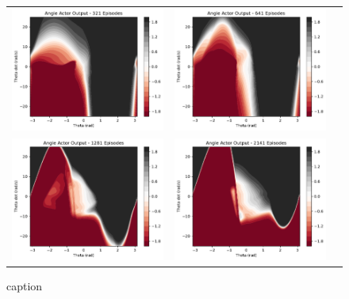 \begin{figure}
\begin{tabular}{ccc}
		\includegraphics[width=65mm]{figures/train_figs/angle_actor/Actor0_321.pdf} &   \includegraphics[width=65mm]{figures/train_figs/angle_actor/Actor0_641.pdf} \\
		\includegraphics[width=65mm]{figures/train_figs/angle_actor/Actor0_1281.pdf} &   \includegraphics[width=65mm]{figures/train_figs/angle_actor/Actor0_2141.pdf} \\
	\end{tabular}
	\caption{caption}
\end{figure}

